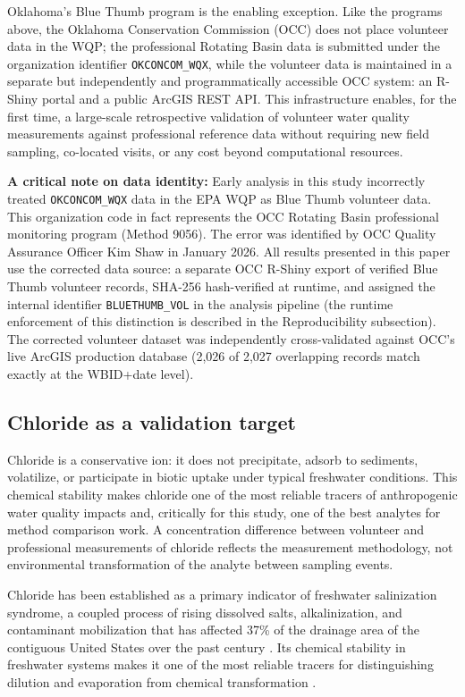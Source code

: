 \documentclass[lineno]{wlpeerj}
\begin{document}
Oklahoma's Blue Thumb program is the enabling exception. Like the programs above, the Oklahoma Conservation Commission (OCC) does not place volunteer data in the WQP; the professional Rotating Basin data is submitted under the organization identifier \texttt{OKCONCOM\_WQX}, while the volunteer data is maintained in a separate but independently and programmatically accessible OCC system: an R-Shiny portal and a public ArcGIS REST API. This infrastructure enables, for the first time, a large-scale retrospective validation of volunteer water quality measurements against professional reference data without requiring new field sampling, co-located visits, or any cost beyond computational resources.

\textbf{A critical note on data identity:} Early analysis in this study incorrectly treated \texttt{OKCONCOM\_WQX} data in the EPA WQP as Blue Thumb volunteer data. This organization code in fact represents the OCC Rotating Basin professional monitoring program (Method 9056). The error was identified by OCC Quality Assurance Officer Kim Shaw in January 2026. All results presented in this paper use the corrected data source: a separate OCC R-Shiny export of verified Blue Thumb volunteer records, SHA-256 hash-verified at runtime, and assigned the internal identifier \texttt{BLUETHUMB\_VOL} in the analysis pipeline (the runtime enforcement of this distinction is described in the Reproducibility subsection). The corrected volunteer dataset was independently cross-validated against OCC's live ArcGIS production database (2,026 of 2,027 overlapping records match exactly at the WBID+date level).

\subsection{Chloride as a validation target}

Chloride is a conservative ion: it does not precipitate, adsorb to sediments, volatilize, or participate in biotic uptake under typical freshwater conditions. This chemical stability makes chloride one of the most reliable tracers of anthropogenic water quality impacts and, critically for this study, one of the best analytes for method comparison work. A concentration difference between volunteer and professional measurements of chloride reflects the measurement methodology, not environmental transformation of the analyte between sampling events.

Chloride has been established as a primary indicator of freshwater salinization syndrome, a coupled process of rising dissolved salts, alkalinization, and contaminant mobilization that has affected 37\% of the drainage area of the contiguous United States over the past century \citep{Kaushal2018}. Its chemical stability in freshwater systems makes it one of the most reliable tracers for distinguishing dilution and evaporation from chemical transformation \citep{Hem1985}.
\end{document}

